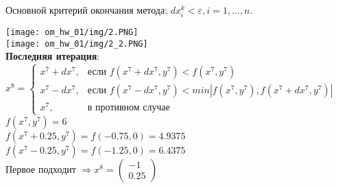 Основной критерий окончания метода: $dx_{i}^{k} < \varepsilon, i = 1, \ldots, n$.

\texttt{[image: om\_hw\_01/img/2.PNG]}\\
\texttt{[image: om\_hw\_01/img/2\_2.PNG]}\\

\textbf{Последняя итерация}:\\
$
x^{8} = 
\begin{cases}
x^{7} + dx^{7},&\text{если $f(x^{7} + dx^{7}, y^{7}) < f(x^{7}, y^{7})$}\\
x^{7} - dx^{7},&\text{если $f(x^{7} - dx^{7}, y^{7}) < min|f(x^{7}, y^{7}), f(x^{7} + dx^{7}, y^{7})|$}\\
x^{7},&\text{в противном случае}
\end{cases}
$\\
$f(x^{7}, y^{7}) = 6$\\
$f(x^{7} + 0.25, y^{7}) = f(-0.75, 0) = 4.9375 $\\
$f(x^{7} - 0.25, y^{7}) = f(-1.25, 0) = 6.4375 $\\
Первое подходит $\Rightarrow x^{8} = 
\begin{pmatrix}
  -1\\
  0.25
\end{pmatrix}
$

\pagebreak